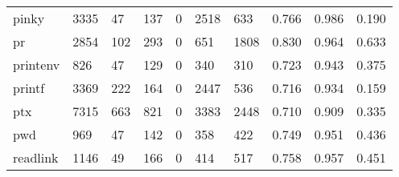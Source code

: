 \begin{longtable}{lp{2.0cm}p{2.0cm}p{2.0cm}p{2.0cm}p{2.0cm}p{2.0cm}p{2.0cm}p{2.0cm}p{2.0cm}}
pinky     &                   3335 &                                 47 &                               137 &                                0 &                              2518 &                             633 &                                   0.766 &                                  0.986 &                                0.190 \\
pr        &                   2854 &                                102 &                               293 &                                0 &                               651 &                            1808 &                                   0.830 &                                  0.964 &                                0.633 \\
printenv  &                    826 &                                 47 &                               129 &                                0 &                               340 &                             310 &                                   0.723 &                                  0.943 &                                0.375 \\
printf    &                   3369 &                                222 &                               164 &                                0 &                              2447 &                             536 &                                   0.716 &                                  0.934 &                                0.159 \\
ptx       &                   7315 &                                663 &                               821 &                                0 &                              3383 &                            2448 &                                   0.710 &                                  0.909 &                                0.335 \\
pwd       &                    969 &                                 47 &                               142 &                                0 &                               358 &                             422 &                                   0.749 &                                  0.951 &                                0.436 \\
readlink  &                   1146 &                                 49 &                               166 &                                0 &                               414 &                             517 &                                   0.758 &                                  0.957 &                                0.451 \\

\end{longtable}
